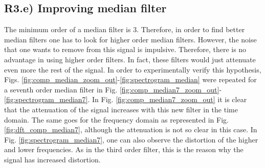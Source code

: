 \documentclass[a4paper, oneside, 11pt]{article}
\begin{document}
\subsection{R3.e) Improving median filter}

The minimum order of a median filter is 3. Therefore, in order to find better median filters one has to look for higher order median filters. However, the noise that one wants to remove from this signal is impulsive. Therefore, there is no advantage in using higher order filters. In fact, these filters would just attenuate even more the rest of the signal. In order to experimentally verify this hypothesis, Figs. \ref{fig:comp_median_zoom_out}-\ref{fig:spectrogram_median} were repeated for a seventh order median filter in Fig. \ref{fig:comp_median7_zoom_out}-\ref{fig:spectrogram_median7}. In Fig. \ref{fig:comp_median7_zoom_out} it is clear that the attenuation of the signal increases with this new filter in the time domain. The same goes for the frequency domain as represented in Fig. \ref{fig:dft_comp_median7}, although the attenuation is not so clear in this case. In Fig. \ref{fig:spectrogram_median7}, one can also observe the distortion of the higher and lower frequencies. As in the third order filter, this is the reason why the signal has increased distortion.
\end{document}
